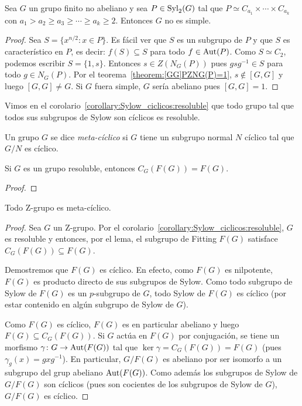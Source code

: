 \begin{corollary}
	Sea $G$ un grupo finito no abeliano y sea $P\in\mathrm{Syl}_2(G)$ tal que $P\simeq
	C_{a_1}\times\cdots\times C_{a_k}$ con $a_1>a_2\geq a_3\geq\cdots\geq
	a_k\geq 2$.  Entonces $G$ no es simple. 
\end{corollary}

\begin{proof}
	Sea $S=\{x^{n/2}:x\in P\}$. Es fácil ver que $S$ es un subgrupo de $P$ y
	que $S$ es característico en $P$, es decir: $f(S)\subseteq S$ para todo
	$f\in\operatorname{Aut}(P)$. Como $S\simeq C_2$, podemos escribir $S=\{1,s\}$. Entonces
	$s\in Z(N_G(P))$ pues $gsg^{-1}\in S$ para todo $g\in N_G(P)$. Por el
	teorema~\ref{theorem:[GG]PZNG(P)=1}, $s\not\in[G,G]$ y luego $[G,G]\ne G$.
	Si $G$ fuera simple, $G$ sería abeliano pues $[G,G]=1$.
\end{proof}

Vimos en el corolario~\ref{corollary:Sylow_ciclicos:resoluble} que todo grupo
tal que todos sus subgrupos de Sylow son cíclicos es resoluble.

Un grupo $G$ se dice \emph{meta-cíclico} si $G$ tiene un subgrupo normal $N$
cíclico tal que $G/N$ es cíclico.

\begin{lemma}
	Si $G$ es un grupo resoluble, entonces $C_G(F(G))=F(G)$.
\end{lemma}

\begin{proof}
	
\end{proof}

\begin{theorem}
	\label{theorem:Z=>metacyclic}
	Todo Z-grupo es meta-cíclico.
\end{theorem}

\begin{proof}
	Sea $G$ un Z-grupo.	Por el
	corolario~\ref{corollary:Sylow_ciclicos:resoluble}, $G$ es resoluble y
	entonces, por el lema, el subgrupo de Fitting $F(G)$ satisface
	$C_G(F(G))\subseteq F(G)$. 
	
	Demostremos que $F(G)$ es cíclico. En efecto, como $F(G)$ es nilpotente,
	$F(G)$ es producto directo de sus subgrupos de Sylow. Como todo subgrupo de
	Sylow de $F(G)$ es un $p$-subgrupo de $G$, todo Sylow de $F(G)$ es cíclico
	(por estar contenido en algún subgrupo de Sylow de $G$). 

	Como $F(G)$ es cíclico, $F(G)$ es en particular abeliano y luego
	$F(G)\subseteq C_G(F(G))$. Si $G$ actúa en $F(G)$ por conjugación, se tiene
	un morfismo $\gamma\colon G\to\operatorname{Aut}(F(G))$ tal que
	$\ker\gamma=C_G(F(G))=F(G)$ (pues $\gamma_g(x)=gxg^{-1}$). En particular,
	$G/F(G)$ es abeliano por ser isomorfo a un subgrupo del grup abeliano
	$\operatorname{Aut}(F(G))$. Como además los subgrupos de Sylow de $G/F(G)$ son cíclicos (pues
	son cocientes de los subgrupos de Sylow de $G$), $G/F(G)$ es cíclico.
\end{proof}

